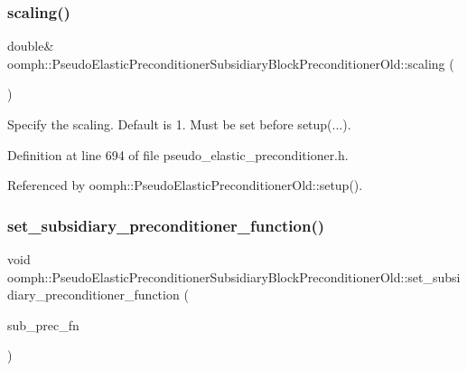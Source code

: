 \subsubsection{\texorpdfstring{scaling()}{scaling()}}
{\footnotesize\ttfamily double\& oomph\+::\+Pseudo\+Elastic\+Preconditioner\+Subsidiary\+Block\+Preconditioner\+Old\+::scaling (\begin{DoxyParamCaption}{ }\end{DoxyParamCaption})\hspace{0.3cm}{\ttfamily [inline]}}



Specify the scaling. Default is 1. Must be set before setup(...). 



Definition at line 694 of file pseudo\+\_\+elastic\+\_\+preconditioner.\+h.



Referenced by oomph\+::\+Pseudo\+Elastic\+Preconditioner\+Old\+::setup().

\mbox{\label{classoomph_1_1PseudoElasticPreconditionerSubsidiaryBlockPreconditionerOld_a6c238d4e402413fe20061d5735acb40c}} 
\subsubsection{\texorpdfstring{set\+\_\+subsidiary\+\_\+preconditioner\+\_\+function()}{set\_subsidiary\_preconditioner\_function()}}
{\footnotesize\ttfamily void oomph\+::\+Pseudo\+Elastic\+Preconditioner\+Subsidiary\+Block\+Preconditioner\+Old\+::set\+\_\+subsidiary\+\_\+preconditioner\+\_\+function (\begin{DoxyParamCaption}\item[{\hyperlink{classoomph_1_1PseudoElasticPreconditionerSubsidiaryBlockPreconditionerOld_a85f57923e70244d5fde0538946eb8c3d}{Subsidiary\+Preconditioner\+Fct\+Pt}}]{sub\+\_\+prec\+\_\+fn }\end{DoxyParamCaption})\hspace{0.3cm}{\ttfamily [inline]}}



